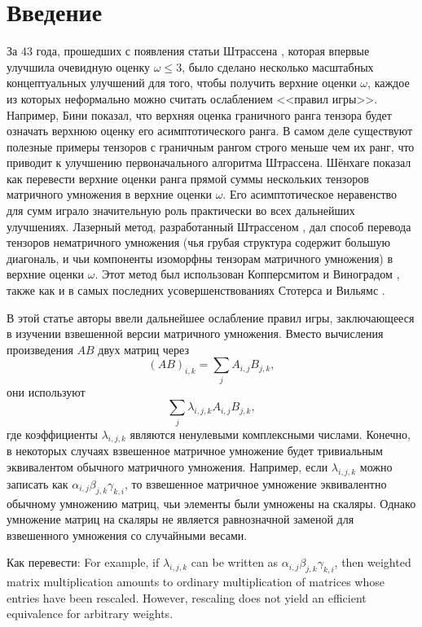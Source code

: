 \section{Введение}

За 43 года, прошедших с появления статьи Штрассена \cite{Strassen:1969}, которая впервые улучшила очевидную оценку $\omega \leq 3$, было сделано несколько масштабных концептуальных улучшений для того, чтобы получить верхние оценки $\omega$, каждое из которых неформально можно считать ослаблением <<правил игры>>. Например, Бини \cite{Bini} показал, что верхняя оценка граничного ранга тензора будет означать верхнюю оценку его асимптотического ранга. В самом деле существуют полезные примеры тензоров с граничным рангом строго меньше чем их ранг, что приводит к улучшению первоначального алгоритма Штрассена. Шёнхаге \cite{Schonhage81} показал как перевести верхние оценки ранга прямой суммы нескольких тензоров матричного умножения в верхние оценки $\omega$. Его асимптотическое неравенство для сумм играло значительную роль практически во всех дальнейших улучшениях. Лазерный метод, разработанный Штрассеном \cite{Strassen1987}, дал способ перевода тензоров нематричного умножения (чья грубая структура содержит большую диагональ, и чьи компоненты изоморфны тензорам матричного умножения) в верхние оценки $\omega$. Этот метод был использован Копперсмитом и Виноградом \cite{Coppersmith:1990}, также как и в самых последних усовершенствованиях Стотерса \cite{stothers2010} и Вильямс \cite{Williams:2011}.

В этой статье авторы ввели дальнейшее ослабление правил игры, заключающееся в изучении взвешенной версии матричного умножения. Вместо вычисления произведения $AB$ двух матриц через
\[
	(AB)_{i,k} = \sum_j A_{i,j} B_{j,k},
\]
они используют 
\[
	\sum_j \lambda_{i,j,k} A_{i,j} B_{j,k},
\]
где коэффициенты $\lambda_{i,j,k}$ являются ненулевыми комплексными числами. Конечно, в некоторых случаях взвешенное матричное умножение будет тривиальным эквивалентом обычного матричного умножения. Например, если $\lambda_{i,j,k}$ можно записать как $\alpha_{i,j} \beta_{j,k} \gamma_{k,i}$, то взвешенное матричное умножение эквивалентно обычному умножению матриц, чьи элементы были умножены на скаляры. Однако умножение матриц на скаляры не является равнозначной заменой для взвешенного умножения со случайными весами.
\begin{question}
  Как перевести: For example, if $\lambda_{i,j,k}$ can be written as $\alpha_{i,j} \beta_{j,k} \gamma_{k,i}$, then weighted matrix multiplication amounts to ordinary multiplication of matrices whose
entries have been rescaled. However, rescaling does not yield an efficient equivalence for arbitrary weights. 
\end{question}

